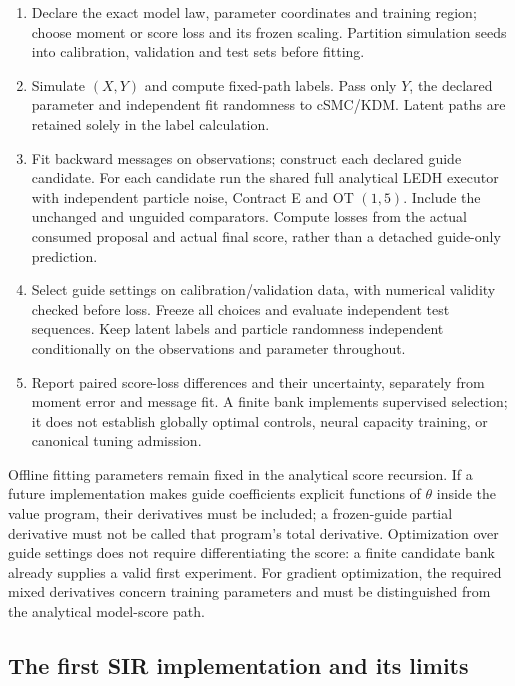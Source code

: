 \begin{enumerate}[leftmargin=*]
\item Declare the exact model law, parameter coordinates and training region;
choose moment or score loss and its frozen scaling. Partition simulation seeds
into calibration, validation and test sets before fitting.
\item Simulate $(X,Y)$ and compute fixed-path labels. Pass only $Y$, the
declared parameter and independent fit randomness to cSMC/KDM. Latent paths
are retained solely in the label calculation.
\item Fit backward messages on observations; construct each declared guide
candidate. For each candidate run the shared full analytical LEDH executor
with independent particle noise, Contract E and OT $(1,5)$. Include the
unchanged and unguided comparators. Compute losses from the actual consumed
proposal and actual final score, rather than a detached guide-only prediction.
\item Select guide settings on calibration/validation data, with numerical
validity checked before loss. Freeze all choices and evaluate independent
test sequences. Keep latent labels and particle randomness independent
conditionally on the observations and parameter throughout.
\item Report paired score-loss differences and their uncertainty, separately
from moment error and message fit. A finite bank implements supervised
selection; it does not establish globally optimal controls, neural capacity
training, or canonical tuning admission.
\end{enumerate}

Offline fitting parameters remain fixed in the analytical score recursion.
If a future implementation makes guide coefficients explicit functions of
$\theta$ inside the value program, their derivatives must be included; a
frozen-guide partial derivative must not be called that program's total
derivative. Optimization over guide settings does not require differentiating
the score: a finite candidate bank already supplies a valid first experiment.
For gradient optimization, the required mixed derivatives concern training
parameters and must be distinguished from the analytical model-score path.

\subsection{The first SIR implementation and its limits}
\label{sec:sg-pilot}

